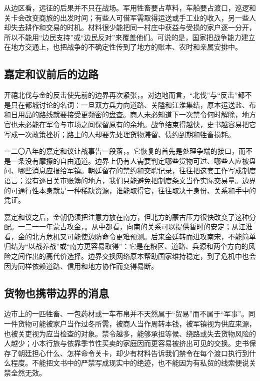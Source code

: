 从边区看，远征的后果并不只在战场。军用牲畜要占草料，车船要占渡口，巡逻和关卡会改变商旅的出发时间；有些人可借军需取得运送或手工业的收入，另一些人却失去耕作和交易的时机。材料很少能把同一村庄中获益与受损的家户逐一分开，所以不能用“边民支持”或“边民反对”来覆盖他们。可说的是，国家把战争能力建立在地方交通上，也把战争的不确定性传到了地方的账本、农时和亲属安排中。

\subsection{嘉定和议前后的边路}

开禧北伐与金的反击使先前的边界再次紧张，。对边地而言，“北伐”与“反击”都不是只在都城讨论的名词：一旦双方兵力向道路、关隘和江淮集结，原本运送盐、布和日用品的路线就要接受更频密的盘查。商人未必知道下一次禁令何时解除，地方官也未必能在军令与市场之间保留原有的余地。战争结束得越快，史书越容易把它写成一次政策挫折；路上的人却要先处理货物滞留、债约到期和牲畜损耗。

一二〇八年的嘉定和议让战事告一段落，。它恢复的首先是处理争端的接口，而不是一条没有摩擦的自由通道。边界上仍有人需要判定哪些货物可过、哪些人应被盘问、哪些消息应报给军镇。朝廷留存的禁约和交聘记录，往往把这套工作写成制度语言；没有逐日关市账簿的地方，我们只能避免把制度条文当作实际交易量。边界的可通行性本身就是一种稀缺资源，谁能取得它，往往取决于身份、关系和手中的凭证。

嘉定和议之后，金朝仍须把注意力放在南方，但北方的蒙古压力很快改变了这种分配。一二一一年蒙古攻金，。从中都看，向南的关系可以提供暂时的安定；从江淮看，金的北方危机又可能使边防命令更难预测。后来金廷转而进攻南宋，不能简单归结为“以战养战”或“南方更容易取得”：它是在粮区、道路、兵源和两个方向的风险之间作出的高代价选择。边界交换网络原本帮助国家维持稳定，到了危机中也会因为同样依赖道路、信用和地方协作而变得易断。

\subsection{货物也携带边界的消息}

边市上的一匹牲畜、一包药材或一车布帛并不天然属于“贸易”而不属于“军事”。同一件货物可能被家户当作过冬所需，被商人当作周转本钱，被军镇视为供应来源，也被关吏视为应当检查的对象。禁令越多，能够承担等候、绕路或失去货物风险的人越少；小本行旅与依靠季节性买卖的家庭因而更容易被挤出可见的交换。史书保存了朝廷担心什么、怎样命令关卡，却少有材料告诉我们禁令在每个渡口执行到什么程度。不能把文书中的严禁写成现实中的绝迹，也不能因为有私贸的线索便说关禁全然无效。

